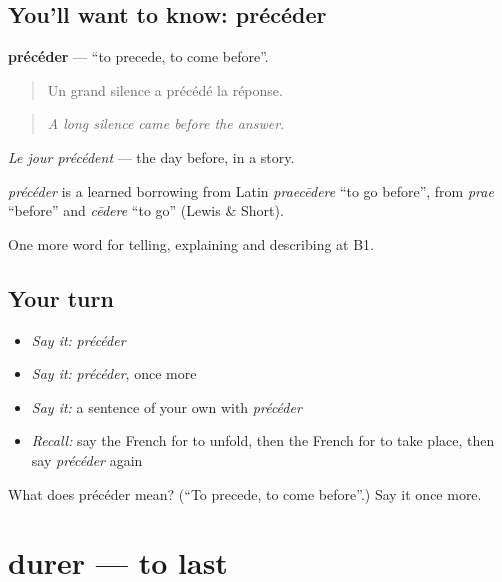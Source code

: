 \subsection*{You'll want to know: précéder}
\textbf{précéder} — \textquotedblleft{}to precede, to come before\textquotedblright{}.

\begin{quote}
Un grand silence a précédé la réponse.
\end{quote}

\begin{quote}
\emph{A long silence came before the answer.}
\end{quote}

\emph{Le jour précédent} — the day before, in a story.

\begin{cousinweb}
\emph{précéder} is a learned borrowing from Latin \emph{praecēdere} \textquotedblleft{}to go before\textquotedblright{}, from \emph{prae} \textquotedblleft{}before\textquotedblright{} and \emph{cēdere} \textquotedblleft{}to go\textquotedblright{} (Lewis \& Short).
\end{cousinweb}

\begin{grammarlens}[title={What you've built}]
One more word for telling, explaining and describing at B1.
\end{grammarlens}

\subsection*{Your turn}
\begin{itemize}
\raggedright
  \item \emph{Say it:} \emph{précéder}
  \item \emph{Say it:} \emph{précéder}, once more
  \item \emph{Say it:} a sentence of your own with \emph{précéder}
  \item \emph{Recall:} say the French for to unfold, then the French for to take place, then say \emph{précéder} again
\end{itemize}

\begin{tcolorbox}[breakable,colback=teal!4,colframe=teal!35!black,title={Before you move on}]
What does précéder mean? (\textquotedblleft{}To precede, to come before\textquotedblright{}.) Say it once more.
\end{tcolorbox}
\section[durer]{durer — to last}

